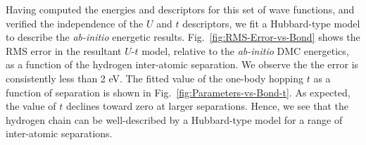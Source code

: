 %
%
Having computed the energies and descriptors for this set of wave functions, and verified the independence of the $U$ and $t$ descriptors, we fit a Hubbard-type model to describe the \textit{ab-initio} energetic results. Fig.~\ref{fig:RMS-Error-vs-Bond} shows the RMS error in the resultant $U$-$t$ model, relative to the \textit{ab-initio} DMC energetics, as a function of the hydrogen inter-atomic separation. We observe the the error is consistently less than 2 eV. The fitted value of the one-body hopping $t$ as a function of separation is shown in Fig.~\ref{fig:Parameters-vs-Bond-t}. As expected, the value of $t$ declines toward zero at larger separations. Hence, we see that the hydrogen chain can be well-described by a Hubbard-type model for a range of inter-atomic separations.

% 
 
